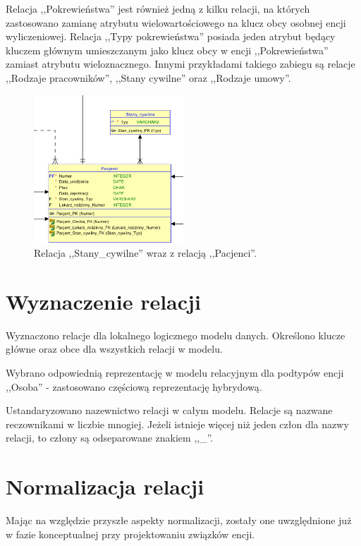 Relacja ,,Pokrewieństwa'' jest również jedną z kilku relacji, na których zastosowano zamianę atrybutu wielowartościowego na klucz obcy osobnej encji wyliczeniowej. Relacja ,,Typy pokrewieństwa'' posiada jeden atrybut będący kluczem głównym umieszczanym jako klucz obcy w encji ,,Pokrewieństwa'' zamiast atrybutu wieloznacznego. Innymi przykładami takiego zabiegu są relacje ,,Rodzaje pracowników'', ,,Stany cywilne'' oraz ,,Rodzaje umowy''.

\begin{figure}[H]
\centering
\includegraphics[width=0.5\textwidth]{img/stany_cywilne.png}
\caption{\small Relacja ,,Stany\_cywilne'' wraz z relacją ,,Pacjenci''.}
\end{figure}


\section{Wyznaczenie relacji}
Wyznaczono relacje dla lokalnego logicznego modelu danych. Określono klucze główne oraz obce dla wszystkich relacji w modelu.

Wybrano odpowiednią reprezentację w modelu relacyjnym dla podtypów encji ,,Osoba'' - zastosowano częściową reprezentację hybrydową.

Ustandaryzowano nazewnictwo relacji w całym modelu. Relacje są nazwane reczownikami w liczbie mnogiej. Jeżeli istnieje więcej niż jeden człon dla nazwy relacji, to człony są odseparowane znakiem ,,\_''.



\section{Normalizacja relacji}
Mając na względzie przyszłe aspekty normalizacji, zostały one uwzględnione już w fazie konceptualnej przy projektowaniu związków encji. 

